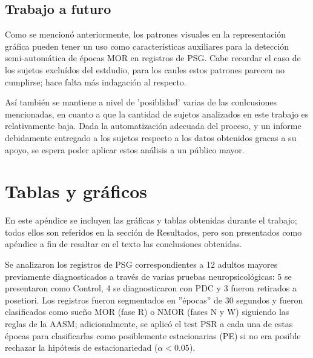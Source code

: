 \documentclass[12pt,a4paper]{mitthesis}
\begin{document}

\section{Trabajo a futuro}

Como se mencion\'o anteriormente, los patrones visuales en la representaci\'on gr\'afica pueden 
tener un uso como caracter\'isticas auxiliares para la detecci\'on semi-autom\'atica de \'epocas 
MOR en registros de PSG.
Cabe recordar el caso de los sujetos exclu\'idos del estdudio, para los caules estos patrones
parecen no cumplirse; hace falta m\'as indagaci\'on al respecto. 

As\'i tambi\'en se mantiene a nivel de 'posiblidad' varias de las conlcusiones mencionadas, en 
cuanto a que la cantidad de sujetos analizados en este trabajo es relativamente baja. Dada la
automatizaci\'on adecuada del proceso, y un informe debidamente entregado a los sujetos respecto a
los datos obtenidos gracas a su apoyo, se espera poder aplicar estos an\'alisis a un p\'ublico 
mayor.


\appendix

\chapter{Tablas y gr\'aficos}

En este ap\'endice se incluyen las gr\'aficas y tablas obtenidas durante el trabajo; todos ellos 
son referidos en la secci\'on de Resultados, pero son presentados como ap\'endice a fin de resaltar 
en el texto las conclusiones obtenidas.

Se analizaron los registros de PSG correspondientes a 12 adultos mayores previamente diagnosticados
a trav\'es de varias pruebas neuropsicol\'ogicas: 5 se presentaron como Control, 4 se 
diagnosticaron con PDC y 3 fueron retirados a posetiori.
Los registros fueron segmentados en ''\'epocas'' de 30 segundos y fueron clasificados como sue\~no 
MOR (fase R) o NMOR (fases N y W) siguiendo las reglas de la AASM\cite{AASM07}; adicionalmente, se 
aplic\'o el test PSR a cada una de estas \'epocas para clasificarlas como posiblemente estacionarias 
(PE) si no era posible rechazar la hip\'otesis de estacionariedad ($\alpha < 0.05$).
\end{document}
